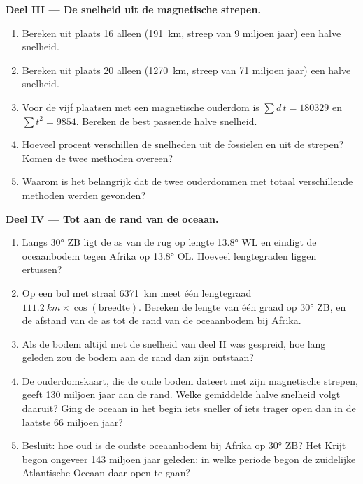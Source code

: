 \begin{problem}
\medskip
\noindent\textbf{Deel III --- De snelheid uit de magnetische strepen.}
\begin{enumerate}[resume]
  \item Bereken uit plaats 16 alleen (\qty{191}{km}, streep van 9 miljoen jaar)
        een halve snelheid.
  \item Bereken uit plaats 20 alleen (\qty{1270}{km}, streep van 71 miljoen
        jaar) een halve snelheid.
  \item Voor de vijf plaatsen met een magnetische ouderdom is $\sum d\,t = \num{180329}$ en
        $\sum t^2 = \num{9854}$. Bereken de best passende halve snelheid.
  \item Hoeveel procent verschillen de snelheden uit de fossielen en uit de
        strepen? Komen de twee methoden overeen?
  \item Waarom is het belangrijk dat de twee ouderdommen met totaal verschillende
        methoden werden gevonden?
\end{enumerate}

\medskip
\noindent\textbf{Deel IV --- Tot aan de rand van de oceaan.}
\begin{enumerate}[resume]
  \item Langs \ang{30} ZB ligt de as van de rug op lengte
        \ang{13.8} WL en eindigt de oceaanbodem tegen Afrika op
        \ang{13.8} OL. Hoeveel lengtegraden liggen ertussen?
  \item Op een bol met straal \qty{6371}{km} meet één lengtegraad
        $\qty{111.2}{km} \times \cos(\text{breedte})$. Bereken de lengte van één
        graad op \ang{30} ZB, en de afstand van de as tot de rand van de
        oceaanbodem bij Afrika.
  \item Als de bodem altijd met de snelheid van deel II was gespreid, hoe lang
        geleden zou de bodem aan de rand dan zijn ontstaan?
  \item De ouderdomskaart, die de oude bodem dateert met zijn magnetische
        strepen, geeft \num{130} miljoen jaar aan de rand. Welke gemiddelde halve
        snelheid volgt daaruit? Ging de oceaan in het begin iets sneller of iets
        trager open dan in de laatste 66 miljoen jaar?
  \item Besluit: hoe oud is de oudste oceaanbodem bij Afrika op
        \ang{30} ZB? Het Krijt begon ongeveer \num{143} miljoen
        jaar geleden: in welke periode begon de zuidelijke Atlantische Oceaan
        daar open te gaan?
\end{enumerate}
\end{problem}
